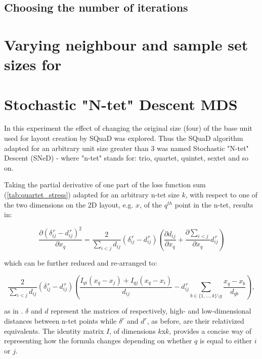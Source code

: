 \documentclass{l4proj}
\begin{document}
\subsection{Choosing the number of iterations}

\section{Varying neighbour and sample set sizes for \cite{Chalmers96}}
\section{Stochastic "N-tet" Descent MDS}

In this experiment the effect of changing the original size  (four) of the base unit used for layout creation by SQuaD was explored. Thus the SQuaD algorithm adapted for an arbitrary unit size greater than 3 was named Stochastic "N-tet" Descent (SNeD) - where "n-tet" stands for: trio, quartet, quintet, sextet and so on.  

Taking the partial derivative of one part of the loss function sum (\ref{tab:quartet_stress}) adapted for an arbitrary n-tet size $k$, with respect to one of the two dimensions on the 2D layout, e.g. $x$, of the $q^{th}$ point in the n-tet, results in: 

\begin{equation}
\label{tab:adapted quartet stress}
    \frac{\partial (\delta_{ij}^{\,r} - d_{ij}^{\,r})^2}{\partial x_q} = \frac{2}{\sum_{i<j}d_{ij}}(\delta_{ij}^{\,r} - d_{ij}^{\,r})\left(\frac{\partial d_{ij}}{\partial x_q} +  \frac{\partial \sum_{i<j}}{\partial x_q}d_{ij}^{\,r}\right) 
\end{equation}

\begin{center} which can be further reduced and re-arranged to: \end{center}

\begin{equation}
\label{tab:adapted quartet stress expanded}
     \frac{2}{\sum_{i<j}d_{ij}}(\delta_{ij}^{\,r} - d_{ij}^{\,r}) \left(\frac{I_{qi}(x_q - x_j) + I_{qj}(x_q - x_i)}{d_{ij}}  -  d_{ij}^{\,r} \sum_{b\in\{1,...,k\}\setminus q} \frac{x_q - x_b}{d_{qb}} \right), 
\end{equation} 

as in \citet{squad}. $\delta$ and $d$ represent the matrices of respectively, high- and low-dimensional distances between n-tet points while $\delta^{r}$ and $d^{r}$, as before, are their relativized equivalents. The identity matrix $I$, of dimensions $k$x$k$, provides a concise way of representing how the formula changes depending on whether $q$ is equal to either $i$ or $j$. 
\end{document}
